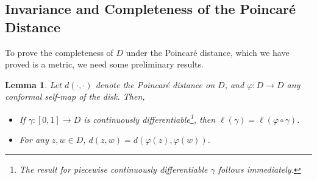 \documentclass[10pt]{article}
\theoremstyle{plain}
\newtheorem{lemma}{Lemma}
\begin{document}
\subsection*{Invariance and Completeness of the Poincaré Distance}
	To prove the completeness of $D$ under the Poincaré distance, which we have proved is a metric, we need some preliminary results.
	
	
		\begin{lemma}
			Let $d(\cdot, \cdot)$ denote the Poincaré distance on $D$, and $\varphi: D \to D$ any conformal self-map of the disk. Then, 
				\begin{itemize}
					\item[(1)] If $\gamma: [0, 1] \to D$ is continuously differentiable\footnote{The result for piecewise continuously differentiable $\gamma$ follows immediately.}, then $\ell(\gamma) = \ell(\varphi \circ \gamma)$. 
					
					\item[(2)] For any $z, w \in D$, $d(z, w) = d(\varphi(z), \varphi(w))$. 
				\end{itemize}
		\end{lemma}
\end{document}
